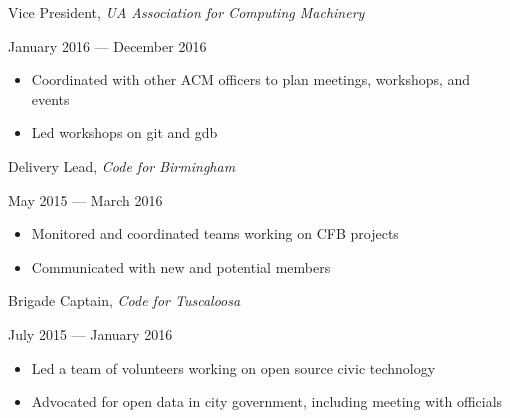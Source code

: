 \documentclass[11pt]{article}
\begin{document}
\vspace{0.4em}
\begin{minipage}[t]{0.65\textwidth}
\flushleft
Vice President, \textit{UA Association for Computing Machinery}\\
\end{minipage}
\begin{minipage}[t]{0.30\textwidth}
\flushright
January 2016 --- December 2016\\
\end{minipage}

\begin{itemize}
  \item Coordinated with other ACM officers to plan meetings, workshops, and events
  \item Led workshops on git and gdb
\end{itemize}

\vspace{0.4em}
\begin{minipage}[t]{0.65\textwidth}
\flushleft
Delivery Lead, \textit{Code for Birmingham}\\
\end{minipage}
\begin{minipage}[t]{0.30\textwidth}
\flushright
May 2015 --- March 2016\\
\end{minipage}

\begin{itemize}
  \item Monitored and coordinated teams working on CFB projects
  \item Communicated with new and potential members
\end{itemize}

\begin{minipage}[t]{0.65\textwidth}
\flushleft
Brigade Captain, \textit{Code for Tuscaloosa}\\
\end{minipage}
\begin{minipage}[t]{0.30\textwidth}
\flushright
July 2015 --- January 2016\\
\end{minipage}

\begin{itemize}
  \item Led a team of volunteers working on open source civic technology
  \item Advocated for open data in city government, including meeting with officials
\end{itemize}
\end{document}
